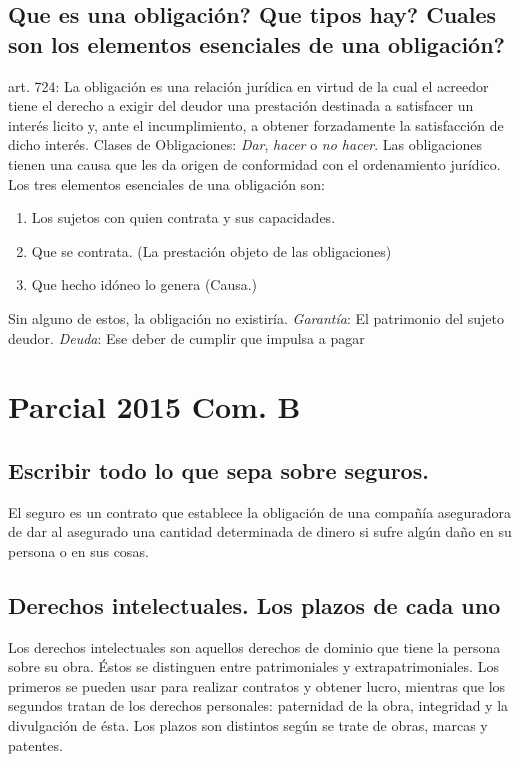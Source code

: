 \documentclass{article}
\begin{document}
\subsection{Que es una obligación? Que tipos hay? Cuales son los elementos esenciales de una obligación?}
\label{sec:QueEsObligacionTiposDeOblElementosDeOblYDeudaGarantia}
art. 724: La obligación es una relación jurídica en virtud de la cual el acreedor tiene el derecho a exigir del deudor una prestación destinada a satisfacer un interés licito y, ante el incumplimiento, a obtener forzadamente la satisfacción de dicho interés.
	Clases de Obligaciones: \textit{Dar}, \textit{hacer} o \textit{no hacer}. 
	Las obligaciones tienen una causa que les da origen de conformidad con el ordenamiento jurídico. Los tres elementos esenciales de una obligación son:
\begin{enumerate}
\item Los sujetos con quien contrata y sus capacidades.
\item Que se contrata. (La prestación objeto de las obligaciones)
\item Que hecho idóneo lo genera (Causa.)
\end{enumerate}
Sin alguno de estos, la obligación no existiría.
\textit{Garantía}: El patrimonio del sujeto deudor. \textit{Deuda}: Ese deber de cumplir que impulsa a pagar

\section{Parcial 2015 Com. B}
\subsection{Escribir todo lo que sepa sobre seguros.}
El seguro es un contrato que establece la obligación de una compañía aseguradora de dar al asegurado una cantidad determinada de dinero si sufre algún daño en su persona o en sus cosas. 
\subsection{Derechos intelectuales. Los plazos de cada uno}
\label{sec:DerechosAutoryPlazos}
Los derechos intelectuales son aquellos derechos de dominio que tiene la persona sobre su obra. Éstos se distinguen entre patrimoniales y extrapatrimoniales. Los primeros se pueden usar para realizar contratos y obtener lucro, mientras que los segundos tratan de los derechos personales: paternidad de la obra, integridad y la divulgación de ésta. 
Los plazos son distintos según se trate de obras, marcas y patentes. 
\end{document}
